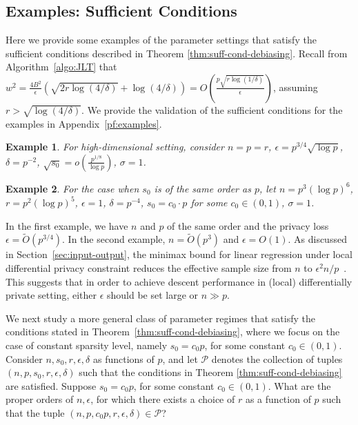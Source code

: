 \documentclass[11pt]{article}
\newtheorem{example}{Example}%
\begin{document}
\subsection{Examples: Sufficient Conditions}\label{sec:suff-cond-eg}
Here we provide some examples of the parameter settings that satisfy the sufficient conditions described in Theorem \ref{thm:suff-cond-debiasing}. Recall from Algorithm~\ref{algo:JLT} that $w^2 = \frac{4B^2}{\epsilon}\left(\sqrt{2r\log(4/\delta)}+\log(4/\delta)\right) = O\left(\frac{p\sqrt{r\log(1/\delta)}}{\epsilon}\right)$, assuming $r>\sqrt{\log(4/\delta)}$. We provide the validation of the sufficient conditions for the examples in Appendix~\ref{pf:examples}.
\begin{example}
For high-dimensional setting, consider $n=p=r$, $\epsilon = p^{3/4}\sqrt{\log p}$, $\delta = p^{-2}$, $\sqrt{s_0} = o\left(\frac{p^{1/8}}{\log p}\right)$, $\sigma=1$. 
\end{example}

\begin{example} 
For the case when $s_0 $ is of the same order as $p$, let $n=p^3(\log p)^6$, $r=p^2(\log p)^5$, $\epsilon=1$, $\delta=p^{-4}$, $s_0 = c_0\cdot p$ for some $c_0\in(0,1)$, $\sigma=1$. 
    
\end{example}


In the first example, we have $n$ and $p$ of the same order and the privacy loss $\epsilon = \tilde{O}(p^{3/4})$. In the second example, $n = \tilde{O}(p^3)$ and $\epsilon = O(1)$. 
As discussed in Section~\ref{sec:input-output}, the minimax bound for linear regression under local differential privacy constraint reduces the effective sample size from $n$ to $\epsilon^2 n/p$~\citep{duchiminimax}. This suggests that in order to achieve descent performance in (local) differentially private setting, either $\epsilon$ should be set large or $n\gg p$. 

We next study a more general class of parameter regimes that satisfy the conditions stated in Theorem~\ref{thm:suff-cond-debiasing}, where we focus on the case of constant sparsity level, namely $s_0 = c_0 p$, for some constant $c_0\in(0,1)$. Consider $n,s_0,r,\epsilon,\delta$ as functions of $p$, and let $\mathcal{P}$ denotes the collection of tuples $(n,p,s_0,r,\epsilon,\delta)$ such that the conditions in Theorem \ref{thm:suff-cond-debiasing} are satisfied. Suppose $s_0 = c_0p$, for some constant $c_0\in (0,1)$. What are the proper orders of $n,\epsilon$, for which there exists a choice of $r$ as a function of $p$ such that the tuple $(n,p,c_0p,r,\epsilon,\delta)\in\mathcal{P}$?
\end{document}
